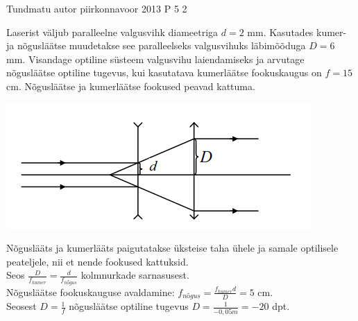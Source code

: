 {Tundmatu autor} %
{piirkonnavoor} %
{2013} %
{P 5} %
{2} %
{
\ifStatement
Laserist väljub paralleelne valgusvihk diameetriga $d = 2$ mm. Kasutades kumer- ja nõgusläätse muudetakse see paralleelseks valgusvihuks läbimõõduga $D = 6$ mm. Visandage optiline süsteem valgusvihu laiendamiseks ja arvutage nõgusläätse optiline tugevus, kui kasutatava kumerläätse fookuskaugus on $f = 15$ cm.
\fi
\ifHint
Nõgusläätse ja kumerläätse fookused peavad kattuma.
\fi
\ifSolution
\begin{center}
	\includegraphics[width=0.5\linewidth]{2013-v2p-05-lah.PNG}
\end{center}
Nõguslääts ja kumerlääts paigutatakse üksteise taha ühele ja samale optilisele peateljele, nii et nende fookused kattuksid. \\
Seos $\frac{D}{f_{kumer}} = \frac{d}{f_{nõgus}}$ kolmnurkade sarnasusest. \\
Nõgusläätse fookuskauguse avaldamine: $f_{nõgus} = \frac{f_{kumer}d}{D} = 5$ cm. \\
Seosest $D = \frac{1}{f}$ nõgusläätse optiline tugevus $D = \frac{1}{-0,05 m} = -20$ dpt. \\
\fi
}
